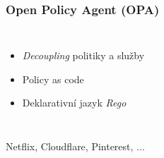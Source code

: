 \begin{frame}
    \frametitle{Open Policy Agent (OPA)}
    \begin{columns}
        \begin{itemize}
            \item \emph{Decoupling} politiky a služby
            \item Policy as code
            \item Deklarativní jazyk \emph{Rego}
        \end{itemize}
        
    \end{columns}
    \vspace{1cm}
    Netflix, Cloudflare, Pinterest, ...
\end{frame}








